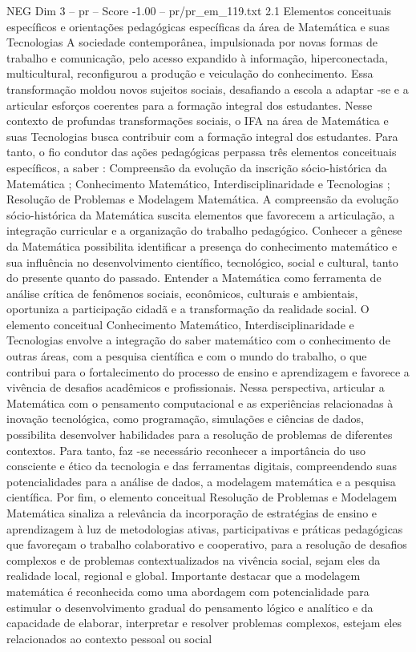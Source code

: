 \begin{textsample}{NEG Dim 3 – pr – Score -1.00 – pr/pr\_em\_119.txt}  \label{ex:f3_neg_132}
2.1 Elementos conceituais específicos e orientações pedagógicas específicas da área de Matemática e suas Tecnologias A sociedade contemporânea, impulsionada por novas formas de trabalho e comunicação, pelo acesso expandido à informação, hiperconectada, multicultural, reconfigurou a produção e veiculação do conhecimento.
Essa transformação moldou novos sujeitos sociais, desafiando a escola a adaptar -se e a articular esforços coerentes para a formação integral dos estudantes.
Nesse contexto de profundas transformações sociais, o IFA na área de Matemática e suas Tecnologias busca contribuir com a formação integral dos estudantes.
Para tanto, o fio condutor das ações pedagógicas perpassa três elementos conceituais específicos, a saber : Compreensão da evolução da inscrição sócio-histórica da Matemática ; Conhecimento Matemático, Interdisciplinaridade e Tecnologias ; Resolução de Problemas e Modelagem Matemática.
A compreensão da evolução sócio-histórica da Matemática suscita elementos que favorecem a articulação, a integração curricular e a organização do trabalho pedagógico.
Conhecer a gênese da Matemática possibilita identificar a presença do conhecimento matemático e sua influência no desenvolvimento científico, tecnológico, social e cultural, tanto do presente quanto do passado.
Entender a Matemática como ferramenta de análise crítica de fenômenos sociais, econômicos, culturais e ambientais, oportuniza a participação cidadã e a transformação da realidade social.
O elemento conceitual Conhecimento Matemático, Interdisciplinaridade e Tecnologias envolve a integração do saber matemático com o conhecimento de outras áreas, com a pesquisa científica e com o mundo do trabalho, o que contribui para o fortalecimento do processo de ensino e aprendizagem e favorece a vivência de desafios acadêmicos e profissionais.
Nessa perspectiva, articular a Matemática com o pensamento computacional e as experiências relacionadas à inovação tecnológica, como programação, simulações e ciências de dados, possibilita desenvolver habilidades para a resolução de problemas de diferentes contextos.
Para tanto, faz -se necessário reconhecer a importância do uso consciente e ético da tecnologia e das ferramentas digitais, compreendendo suas potencialidades para a análise de dados, a modelagem matemática e a pesquisa científica.
Por fim, o elemento conceitual Resolução de Problemas e Modelagem Matemática sinaliza a relevância da incorporação de estratégias de ensino e aprendizagem à luz de metodologias ativas, participativas e práticas pedagógicas que favoreçam o trabalho colaborativo e cooperativo, para a resolução de desafios complexos e de problemas contextualizados na vivência social, sejam eles da realidade local, regional e global.
Importante destacar que a modelagem matemática é reconhecida como uma abordagem com potencialidade para estimular o desenvolvimento gradual do pensamento lógico e analítico e da capacidade de elaborar, interpretar e resolver problemas complexos, estejam eles relacionados ao contexto pessoal ou social

\end{textsample}
